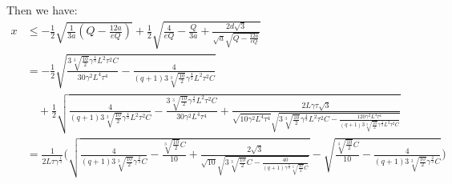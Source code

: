 Then we have:
\begin{align}
    x&\leq -\frac{1}{2}\sqrt{\frac{1}{3a}\left(Q-\frac{12a}{eQ}\right)}+\frac{1}{2}\sqrt{\frac{4}{eQ}-\frac{Q}{3a}+\frac{2d\sqrt{3}}{\sqrt{a}\sqrt{Q-\frac{12a}{e Q}}}}\nonumber\\
    &=-\frac{1}{2}\sqrt{\frac{3\sqrt[3]{\frac{10}{2}}\gamma^{\frac{4}{3}} L^2\tau^2 C}{30\gamma^2L^4\tau^4}-\frac{4}{(q+1)3\sqrt[3]{\frac{10}{2}}\gamma^{\frac{4}{3}} L^2\tau^2 C}}\nonumber\\
    &\quad+\frac{1}{2}\sqrt{\frac{4}{(q+1)3\sqrt[3]{\frac{10}{2}}\gamma^{\frac{4}{3}} L^2\tau^2 C}-\frac{3\sqrt[3]{\frac{10}{2}}\gamma^{\frac{4}{3}} L^2\tau^2 C}{30\gamma^2L^4\tau^4}+\frac{2L\gamma\tau\sqrt{3}}{\sqrt{10\gamma^2L^4\tau^4}\sqrt{3\sqrt[3]{\frac{10}{2}}\gamma^{\frac{4}{3}} L^2\tau^2 C-\frac{120 \gamma^2L^4\tau^4}{(q+1) 3\sqrt[3]{\frac{10}{2}}\gamma^{\frac{4}{3}} L^2\tau^2 C}}}}\nonumber\\
    &=\frac{1}{2L\tau\gamma^{\frac{1}{3}}}\Big(\sqrt{\frac{4}{(q+1)3\sqrt[3]{\frac{10}{2}}\gamma^{\frac{2}{3}} C}-\frac{\sqrt[3]{\frac{10}{2}} C}{10}+\frac{2\sqrt{3}}{\sqrt{10}\sqrt{3\sqrt[3]{\frac{10}{2}} C-\frac{40 }{(q+1)\gamma^{\frac{2}{3}} \sqrt[3]{\frac{10}{2}} C}}}}-\sqrt{\frac{\sqrt[3]{\frac{10}{2}} C}{10}-\frac{4}{(q+1)3\sqrt[3]{\frac{10}{2}}\gamma^{\frac{2}{3}} C}}\Big)\nonumber\\
\end{align}